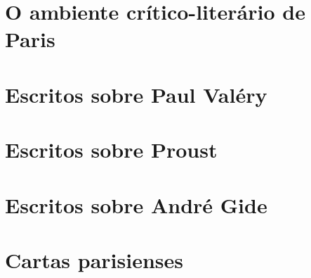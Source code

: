 %

\part{O ambiente crítico-literário de Paris}




\part{Escritos sobre Paul Valéry}



\part{Escritos sobre Proust}


\part{Escritos sobre André Gide}




\part{Cartas parisienses}



